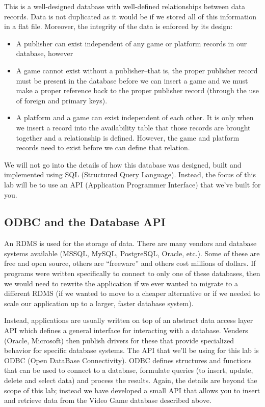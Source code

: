 \documentclass[12pt]{scrartcl}
\begin{document}
This is a well-designed database with well-defined relationships 
between data records.  Data is not duplicated as it would be if 
we stored all of this information in a flat file.  Moreover, the 
integrity of the data is enforced by its design:
\begin{itemize}
  \item A publisher can exist independent of any game or platform 
  	records in our database, however
  \item A game cannot exist without a publisher--that is, the proper 
	publisher record must be present in the database before we 
	can insert a game and we must make a proper reference back 
	to the proper publisher record (through the use of foreign and 
	primary keys).
  \item A platform and a game can exist independent of each other.  
	It is only when we insert a record into the availability table that 
	those records are brought together and a relationship is defined.  
	However, the game and platform records need to exist before 
	we can define that relation.
\end{itemize}
	
We will not go into the details of how this database was designed, 
built and implemented using SQL (Structured Query Language).  
Instead, the focus of this lab will be to use an API (Application 
Programmer Interface) that we've built for you.

\subsection*{ODBC and the Database API}

An RDMS is used for the storage of data.  There are many vendors 
and database systems available (MSSQL, MySQL, PostgreSQL, 
Oracle, etc.).  Some of these are free and open source, others are 
``freeware'' and others cost millions of dollars.  If programs were 
written specifically to connect to only one of these databases, then 
we would need to rewrite the application if we ever wanted to 
migrate to a different RDMS (if we wanted to move to a cheaper 
alternative or if we needed to scale our application up to a larger, 
faster database system).  

Instead, applications are usually written on top of an abstract data 
access layer API which defines a general interface for interacting 
with a database.  Venders (Oracle, Microsoft) then publish drivers 
for these that provide specialized behavior for specific database 
systems.  The API that we'll be using for this lab is ODBC (Open 
DataBase Connectivity).  ODBC defines structures and functions 
that can be used to connect to a database, formulate queries (to 
insert, update, delete and select data) and process the results.  
Again, the details are beyond the scope of this lab; instead we 
have developed a small API that allows you to insert and retrieve 
data from the Video Game database described above.  
\end{document}
